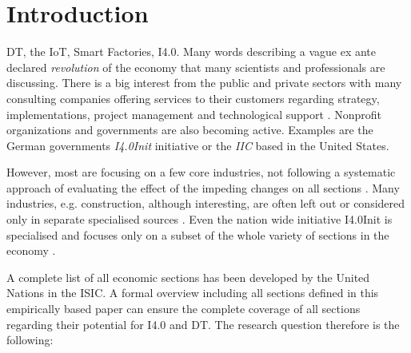 \section{Introduction}\label{Introduction}
\ac{DT}, the \ac{IoT}, Smart Factories,
\ac{I4.0}. Many words describing a vague ex ante declared
\emph{revolution} of the economy that many scientists and professionals are discussing.
There is a big interest from the public and private sectors with many consulting companies offering services to their customers regarding strategy, implementations, project management and technological support
\cite{westerman2011digital,mckinsey-nine-questions,bcg-dt,accenture-dt:2015}.
Nonprofit organizations and governments are also becoming active. Examples are the German governments \emph{\ac{I4.0Init}} \cite{i40-web} initiative or the \emph{\ac{IIC}} \cite{iic-web} based in the United States.

However, most are focusing on a few core industries, not following a systematic approach of evaluating the effect of the impeding changes on all sections \cite{westerman2011digital, pwc2016survey}.
Many industries, e.g. construction, although interesting, are often left out or considered only in separate specialised sources \cite{rolandbergerBauwirtschaft:2016}. 
Even the nation wide initiative \acl{I4.0Init} is specialised and focuses only on a subset of the whole variety of sections in the economy \cite{umsetzungsstrategie:2015}. 

A complete list of all economic sections has been developed by the United Nations in the \ac{ISIC}\cite{ISIC:2008}. A formal overview including all sections defined in this empirically based paper can ensure the complete coverage of all sections regarding their potential for \ac{I4.0} and \ac{DT}. The research question therefore is the following:

